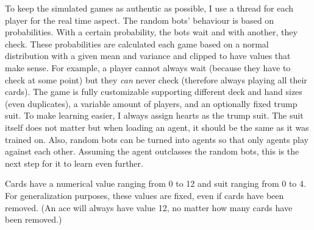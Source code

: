 \documentclass[a4paper,titlepage]{article}
\begin{document}
To keep the simulated games as authentic as possible, I use a thread for each player for the real time aspect. The random bots' behaviour is based on probabilities. With a certain probability, the bots wait and with another, they check. These probabilities are calculated each game based on a normal distribution with a given mean and variance and clipped to have values that make sense. For example, a player cannot always wait (because they have to check at some point) but they \emph{can} never check (therefore always playing all their cards). The game is fully customizable supporting different deck and hand sizes (even duplicates), a variable amount of players, and an optionally fixed trump suit. To make learning easier, I always assign hearts as the trump suit. The suit itself does not matter but when loading an agent, it should be the same as it was trained on. Also, random bots can be turned into agents so that only agents play against each other. Assuming the agent outclasses the random bots, this is the next step for it to learn even further. %

Cards have a numerical value ranging from 0 to 12 and suit ranging from 0 to 4. For generalization purposes, these values are fixed, even if cards have been removed. (An ace will always have value 12, no matter how many cards have been removed.) \medskip
\end{document}
